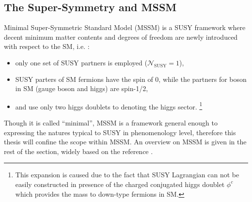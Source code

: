 \subsection{The Super-Symmetry and MSSM}
Minimal Super-Symmetric Standard Model (MSSM) is a SUSY framework where decent minimum matter contents and degrees of freedom are newly introduced with respect to the SM, i.e. :
\begin{itemize}
\item only one set of SUSY partners is employed ($\mathcal{N}_{\mathrm{SUSY}}=1$),
\item SUSY parters of SM fermions have the spin of 0, while the partners for boson in SM (gauge boson and higgs) are spin-1/2,
\item and use only two higgs doublets to denoting the higgs sector.
\footnote{This expansion is caused due to the fact that  SUSY Lagrangian can not be easily constructed in presence of the charged conjugated higgs doublet $\phi^c$ which provides the mass to down-type fermions in SM.}
\end{itemize}

Though it is called ``minimal'', MSSM is a framework general enough to expressing the natures typical to SUSY in phenomenology level, therefore this thesis will confine the scope within MSSM. An overview on MSSM is given in the rest of the section, widely based on the reference \cite{SUSYPrimer}. \\


